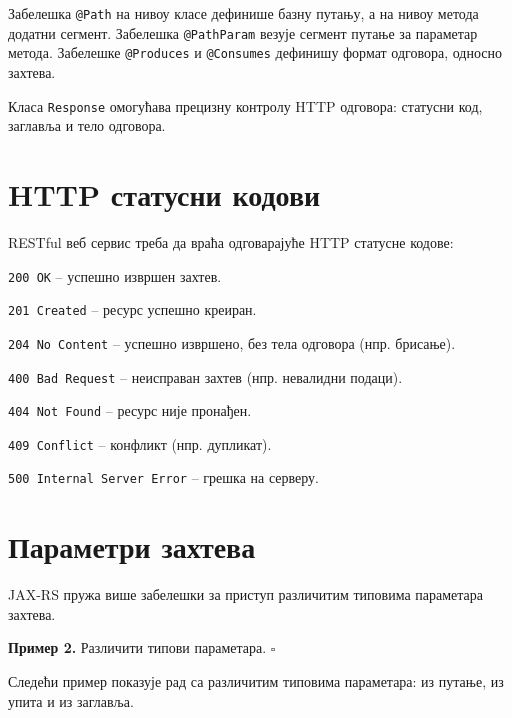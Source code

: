 Забелешка \texttt{@Path} на нивоу класе дефинише базну путању, а на нивоу метода додатни сегмент. Забелешка \texttt{@PathParam} везује сегмент путање за параметар метода. Забелешке \texttt{@Produces} и \texttt{@Consumes} дефинишу формат одговора, односно захтева.

Класа \texttt{Response} омогућава прецизну контролу HTTP одговора: статусни код, заглавља и тело одговора.


\section{HTTP статусни кодови}

RESTful веб сервис треба да враћа одговарајуће HTTP статусне кодове:

\texttt{200 OK} – успешно извршен захтев.

\texttt{201 Created} – ресурс успешно креиран.

\texttt{204 No Content} – успешно извршено, без тела одговора (нпр. брисање).

\texttt{400 Bad Request} – неисправан захтев (нпр. невалидни подаци).

\texttt{404 Not Found} – ресурс није пронађен.

\texttt{409 Conflict} – конфликт (нпр. дупликат).

\texttt{500 Internal Server Error} – грешка на серверу.


\section{Параметри захтева}

JAX-RS пружа више забелешки за приступ различитим типовима параметара захтева.


\bigskip

\noindent \textbf{Пример 2.} Различити типови параметара. $\square$

\medskip

Следећи пример показује рад са различитим типовима параметара: из путање, из упита и из заглавља.


